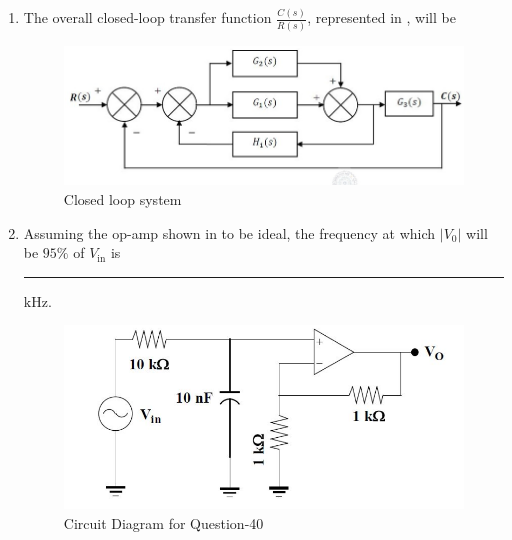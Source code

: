 \documentclass[journal,12pt,onecolumn]{IEEEtran}
\theoremstyle{remark}
\begin{document}
\begin{enumerate}
\item The overall closed-loop transfer function $\frac{C(s)}{R(s)}$, represented in , will be \par \hfill{}
\begin{figure}[H]
    \centering
    \includegraphics[width=0.7\columnwidth]{Figs/Q-39.png}
    \caption{Closed loop system}
    \label{fig:placeholder_17}
\end{figure}
\begin{enumerate}
\end{enumerate}

\item Assuming the op-amp shown in  to be ideal, the frequency at which $|V_0|$ will be $95\%$ of $V_{\text{in}}$ is \rule{1.5cm}{0.4pt} $\text{kHz}$. \par \hfill{}
\begin{figure}[H]
    \centering
    \includegraphics[width=0.6\columnwidth]{Figs/Q-40.png}
    \caption{Circuit Diagram for Question-40}
    \label{fig:placeholder_18}
\end{figure}


\end{enumerate}
\end{document}
